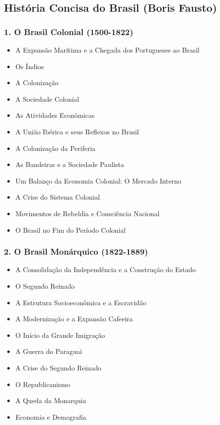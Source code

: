 \documentclass[a4paper,12pt]{article}[abntex2]
\begin{document}
\subsection{História Concisa do Brasil (Boris Fausto)}
\subsubsection*{1. O Brasil Colonial (1500-1822)}

\begin{itemize}
\item A Expansão Marítima e a Chegada dos Portugueses ao Brasil
\item Os Índios
\item A Colonização
\item A Sociedade Colonial
\item As Atividades Econômicas
\item A União Ibérica e seus Reflexos no Brasil
\item A Colonização da Periferia
\item As Bandeiras e a Sociedade Paulista
\item Um Balanço da Economia Colonial: O Mercado Interno
\item A Crise do Sistema Colonial
\item Movimentos de Rebeldia e Consciência Nacional
\item O Brasil no Fim do Período Colonial
\end{itemize}
\subsubsection*{2. O Brasil Monárquico (1822-1889)}

\begin{itemize}
\item A Consolidação da Independência e a Construção do Estado
\item O Segundo Reinado
\item A Estrutura Socioeconômica e a Escravidão
\item A Modernização e a Expansão Cafeeira
\item O Início da Grande Imigração
\item A Guerra do Paraguai
\item A Crise do Segundo Reinado
\item O Republicanismo
\item A Queda da Monarquia
\item Economia e Demografia
\end{itemize}
\end{document}
